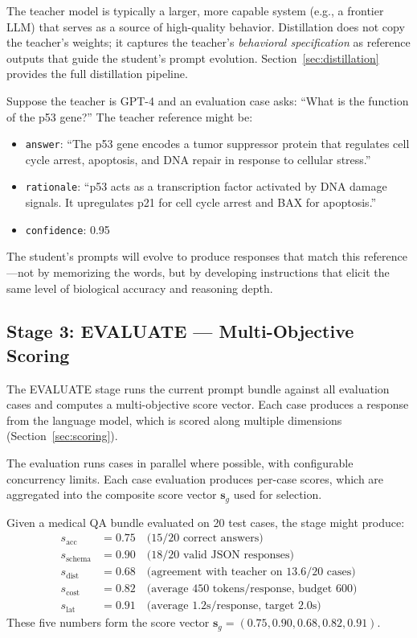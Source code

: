 The teacher model is typically a larger, more capable system (e.g., a frontier LLM) that serves as a source of high-quality behavior. Distillation does not copy the teacher's weights; it captures the teacher's \emph{behavioral specification} as reference outputs that guide the student's prompt evolution. Section~\ref{sec:distillation} provides the full distillation pipeline.

\begin{example}
Suppose the teacher is GPT-4 and an evaluation case asks: ``What is the function of the p53 gene?'' The teacher reference might be:
\begin{itemize}[leftmargin=1.5em]
  \item \texttt{answer}: ``The p53 gene encodes a tumor suppressor protein that regulates cell cycle arrest, apoptosis, and DNA repair in response to cellular stress.''
  \item \texttt{rationale}: ``p53 acts as a transcription factor activated by DNA damage signals. It upregulates p21 for cell cycle arrest and BAX for apoptosis.''
  \item \texttt{confidence}: 0.95
\end{itemize}
The student's prompts will evolve to produce responses that match this reference---not by memorizing the words, but by developing instructions that elicit the same level of biological accuracy and reasoning depth.
\end{example}

\subsection{Stage 3: EVALUATE --- Multi-Objective Scoring}

The EVALUATE stage runs the current prompt bundle against all evaluation cases and computes a multi-objective score vector. Each case produces a response from the language model, which is scored along multiple dimensions (Section~\ref{sec:scoring}).

The evaluation runs cases in parallel where possible, with configurable concurrency limits. Each case evaluation produces per-case scores, which are aggregated into the composite score vector $\mathbf{s}_g$ used for selection.

\begin{example}
Given a medical QA bundle evaluated on 20 test cases, the stage might produce:
\begin{align*}
s_{\text{acc}} &= 0.75 \quad \text{(15/20 correct answers)} \\
s_{\text{schema}} &= 0.90 \quad \text{(18/20 valid JSON responses)} \\
s_{\text{dist}} &= 0.68 \quad \text{(agreement with teacher on 13.6/20 cases)} \\
s_{\text{cost}} &= 0.82 \quad \text{(average 450 tokens/response, budget 600)} \\
s_{\text{lat}} &= 0.91 \quad \text{(average 1.2s/response, target 2.0s)}
\end{align*}
These five numbers form the score vector $\mathbf{s}_g = (0.75, 0.90, 0.68, 0.82, 0.91)$.
\end{example}


